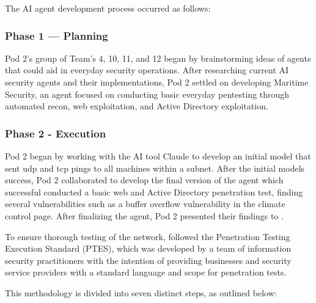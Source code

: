 The AI agent development process occurred as follows:

\subsubsection*{Phase 1 — Planning}
Pod 2's group of Team's 4, 10, 11, and 12 began by brainstorming ideas of agents that could aid in everyday security operations. After researching current AI security agents and their implementations, Pod 2 settled on developing Maritime Security, an agent focused on conducting basic everyday pentesting through automated recon, web exploitation, and Active Directory exploitation.

\subsubsection*{Phase 2 - Execution}
Pod 2 began by working with the AI tool Claude to develop an initial model that sent udp and tcp pings to all machines within a subnet. After the initial models success, Pod 2 collaborated to develop the final version of the agent which successful conducted a basic web and Active Directory penetration test, finding several vulnerabilities such as a buffer overflow vulnerability in the climate control page. After finalizing the agent, Pod 2 presented their findings to \client.
  

\newpage


 \label{sec:ptesAppendix}

To ensure thorough testing of the \client network, \team followed the Penetration Testing Execution Standard (PTES), which was developed by a team of information security practitioners with the intention of providing businesses and security service providers with a standard language and scope for penetration tests.

This methodology is divided into seven distinct steps, as outlined below:

